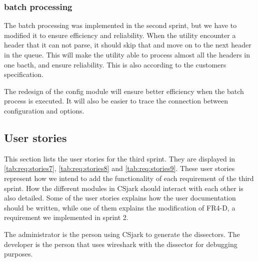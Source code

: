 \subsubsection{\Gls{batch processing}}
The \gls{batch processing} was implemented in the second sprint, but we have to modified it to ensure efficiency and reliability. When the \gls{utility} encounter a \gls{header} that it can not parse, it should skip that and move on to the next \gls{header} in the queue. This will make the \gls{utility} able to process almost all the \glspl{header} in one bacth, and ensure reliability. This is also according to the customers specification.

The redesign of the config module will ensure better efficiency when the batch process is executed. It will also be easier to trace the connection between configuration and options. 

\subsection{User stories}
\label{sec:req:stories3}
This section lists the user stories for the third sprint.
They are displayed in \autoref{tab:req:stories7}, \autoref{tab:req:stories8} and \autoref{tab:req:stories9}.
These user stories represent how we intend to add the functionality of each requirement of the third sprint.
How the different modules in CSjark should interact with each other is also detailed.
Some of the user stories explains how the user documentation should be written,
while one of them explains the modification of FR4-D, a requirement we implemented in sprint 2.

The administrator is the person using CSjark to generate the \glspl{dissector}. 
The developer is the person that uses \Gls{wireshark} with the \gls{dissector} for debugging purposes.

